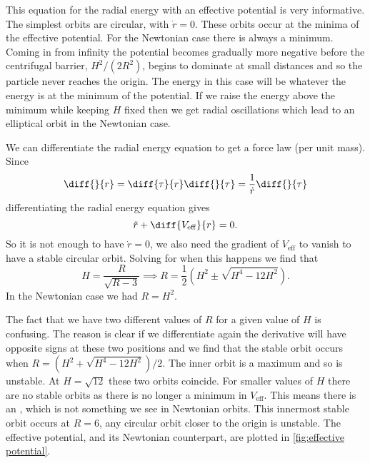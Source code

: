 \documentclass[fleqn]{NotesClass}
\begin{document}
    This equation for the radial energy with an effective potential is very informative.
    The simplest orbits are circular, with \(\dot{r} = 0\).
    These orbits occur at the minima of the effective potential.
    For the Newtonian case there is always a minimum.
    Coming in from infinity the potential becomes gradually more negative before the centrifugal barrier, \(H^2/(2R^2)\), begins to dominate at small distances and so the particle never reaches the origin.
    The energy in this case will be whatever the energy is at the minimum of the potential.
    If we raise the energy above the minimum while keeping \(H\) fixed then we get radial oscillations which lead to an elliptical orbit in the Newtonian case.
    
    We can differentiate the radial energy equation to get a force law (per unit mass).
    Since
    \begin{equation}
        \diff{}{r} = \diff{\tau}{r}\diff{}{\tau} = \frac{1}{\dot{r}}\diff{}{\tau}
    \end{equation}
    differentiating the radial energy equation gives
    \begin{equation}
        \ddot{r} + \diff{V_{\mathrm{eff}}}{r} = 0.
    \end{equation}
    So it is not enough to have \(\dot{r} = 0\), we also need the gradient of \(V_\mathrm{eff}\) to vanish to have a stable circular orbit.
    Solving for when this happens we find that
    \begin{equation}
        H = \frac{R}{\sqrt{R - 3}} \implies R = \frac{1}{2}(H^2 \pm \sqrt{H^4 - 12H^2}).
    \end{equation}
    In the Newtonian case we had \(R = H^2\).
    
    The fact that we have two different values of \(R\) for a given value of \(H\) is confusing.
    The reason is clear if we differentiate again the derivative will have opposite signs at these two positions and we find that the stable orbit occurs when \(R = (H^2 + \sqrt{H^4 - 12H^2})/2\).
    The inner orbit is a maximum and so is unstable.
    At \(H = \sqrt{12}\) these two orbits coincide.
    For smaller values of \(H\) there are no stable orbits as there is no longer a minimum in \(V_{\mathrm{eff}}\).
    This means there is an , which is not something we see in Newtonian orbits.
    This innermost stable orbit occurs at \(R = 6\), any circular orbit closer to the origin is unstable.
    The effective potential, and its Newtonian counterpart, are plotted in \cref{fig:effective potential}.
    
\end{document}
